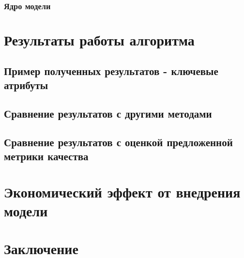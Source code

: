 \documentclass[12pt,a4paper]{article} %
\begin{document}
\subsubsection{Ядро модели}


\newpage
\section{Результаты работы алгоритма}
\subsection{Пример полученных результатов - ключевые атрибуты}

\subsection{Сравнение результатов с другими методами}

\subsection{Сравнение результатов с оценкой предложенной метрики качества}



\newpage
\section{Экономический эффект от внедрения модели}



\newpage
\section{Заключение}





\newpage



\nocite{GV}
\end{document}
